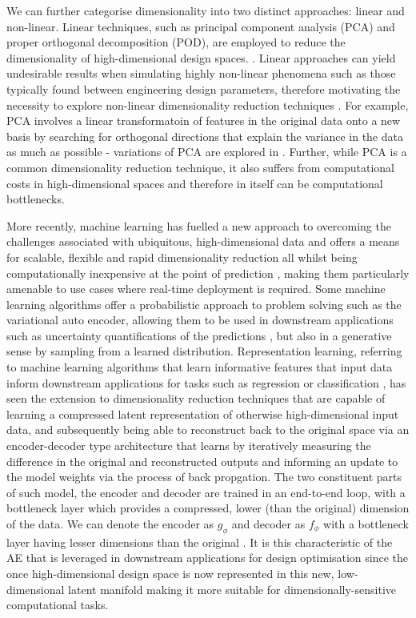 \documentclass{article}
\begin{document}
We can further categorise dimensionality into two distinct approaches: linear and non-linear. Linear techniques, such as principal component analysis (PCA) and proper orthogonal decomposition (POD), are employed to reduce the dimensionality of high-dimensional design spaces.  \citep{Diez2024}. Linear approaches can yield undesirable results when simulating highly non-linear phenomena \citep{Deshpande2024} such as those typically found between engineering design parameters, therefore motivating the necessity to explore non-linear dimensionality reduction techniques \citep{Diez2024}. For example, PCA involves a linear transformatoin of features in the original data onto a new basis \citep{Donnelly2024} by searching for orthogonal directions that explain the variance in the data as much as possible - variations of PCA are explored in \cite{Sorzano2014}. Further, while PCA is a common dimensionality reduction technique, it also suffers from computational costs in high-dimensional spaces \citep{Donnelly2024} and therefore in itself can be computational bottlenecks.

More recently, machine learning has fuelled a new approach to overcoming the challenges associated with ubiquitous, high-dimensional data and offers a means for scalable, flexible and rapid dimensionality reduction all whilst being computationally inexpensive at the point of prediction \citep{Deshpande2024}, making them particularly amenable to use cases where real-time deployment is required.  Some machine learning algorithms offer a probabilistic approach to problem solving such as the variational auto encoder, allowing them to be used in downstream applications such as uncertainty quantifications of the predictions \citep{Donnelly2024}, but also in a generative sense by sampling from a learned distribution. Representation learning, referring to machine learning algorithms that learn informative features that input data inform downstream applications for tasks such as regression or classification \citep{Bengio2012}, has seen the extension to dimensionality reduction techniques that are capable of learning a compressed latent representation of otherwise high-dimensional input data, and subsequently being able to reconstruct back to the original space via an encoder-decoder type architecture that learns by iteratively measuring the difference in the original and reconstructed outputs \citep{Huang2022} and informing an update to the model weights via the process of back propgation. The two constituent parts of such model, the encoder and decoder are trained in an end-to-end loop, with a bottleneck layer which provides a compressed, lower (than the original) dimension of the data. We can denote the encoder as  $g_\phi$ and decoder as $f_\phi$ with a bottleneck layer having lesser dimensions than the original \citep{DAgostino2018}. It is this characteristic of the AE that is leveraged in downstream applications for design optimisation since the once high-dimensional design space is now represented in this new, low-dimensional latent manifold making it more suitable for dimensionally-sensitive computational tasks.
\end{document}
